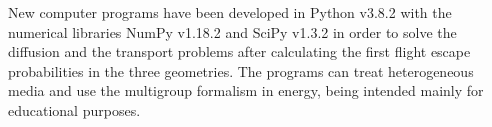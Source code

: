 \documentclass{ictt26}
\begin{document}
%
%
%

New computer programs have been developed in Python v3.8.2 with the numerical libraries NumPy v1.18.2 and SciPy v1.3.2 in order to solve the diffusion and the transport problems after calculating the first flight escape probabilities in the three geometries. The programs can treat heterogeneous media and use the multigroup formalism in energy, being intended mainly for educational purposes.
\end{document}
